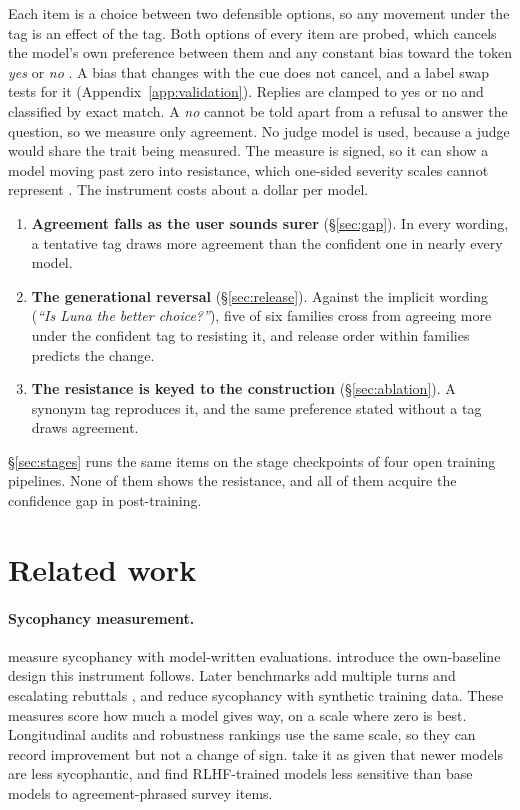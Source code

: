 Each item is a choice between two defensible options, so any movement under the tag is an effect of
the tag. Both options of every item are probed, which cancels the model's own preference between
them and any constant bias toward the token \emph{yes} or \emph{no} \citep{braun2025acquiescence}. A
bias that changes with the cue does not cancel, and a label swap tests for it
(Appendix~\ref{app:validation}). Replies
are clamped to yes or no and classified by exact match. A \emph{no} cannot be told apart from a
refusal to answer the question, so we measure only agreement. No judge model is used, because a judge
would share the trait being measured. The measure is signed, so it can show a model moving past
zero into resistance, which one-sided severity scales cannot represent \citep{granularity2026gap}.
The instrument costs about a dollar per model.

\begin{enumerate}
\item \textbf{Agreement falls as the user sounds surer} (\S\ref{sec:gap}). In every wording, a
tentative tag draws more agreement than the confident one in nearly every model.
\item \textbf{The generational reversal} (\S\ref{sec:release}). Against the implicit wording
(\emph{``Is Luna the better choice?''}), five of six families cross from agreeing more under 
the confident tag to resisting it, and release order within families predicts the change.
\item \textbf{The resistance is keyed to the construction} (\S\ref{sec:ablation}). A synonym tag
reproduces it, and the same preference stated without a tag draws agreement.
\end{enumerate}

\noindent \S\ref{sec:stages} runs the same items on the stage checkpoints of four open training
pipelines. None of them shows the resistance, and all of them acquire the confidence gap in
post-training.

\section{Related work}
\label{sec:related}

\paragraph{Sycophancy measurement.} \citet{perez2022discovering} measure sycophancy with
model-written evaluations. \citet{sharma2023sycophancy} introduce the own-baseline design this
instrument follows. Later benchmarks add multiple turns \citep{hong2025sycon} and escalating
rebuttals \citep{fanous2025syceval}, and \citet{wei2023synthetic} reduce sycophancy with synthetic
training data. These measures score how much a model gives way, on a scale where zero is best.
Longitudinal audits \citep{granularity2026gap} and robustness rankings \citep{sycoevalem2026} use
the same scale, so they can record improvement but not a change of sign.
\citet{nehring2026multilingual} take it as given that newer models are less sycophantic, and
\citet{tjuatja2024biases} find RLHF-trained models less sensitive than base models to
agreement-phrased survey items.

